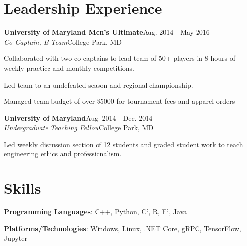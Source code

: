 \documentclass[letterpaper,11pt]{article}
\def \jobskip{.5em}
\newcommand{\resentry}[6]{
\large{\sffamily\textbf{#1}}\hfill{\rmfamily\normalsize\textcolor{faded}{#2}} \\
\normalsize{#3}\hfill{\textcolor{faded}{\normalsize#4}}\\
\normalsize{#5}
\footnotesize{#6}
}
\newcommand{\resitem}[1]{\normalsize{\item #1}}
\begin{document}
\section*{Leadership Experience}
\resentry{{University of Maryland Men's Ultimate}}{Aug. 2014 \-- May 2016}{\emph{Co-Captain, B Team}}{College Park, MD}{\vspace{-1em}}
   { 
      \begin{resumeitemize}
	\item{Collaborated with two co-captains to lead team of 50+ players in 8 hours of weekly practice and monthly competitions.}
	\item{Led team to an undefeated season and regional championship.}
	\item{Managed team budget of over \$5000 for tournament fees and apparel orders}
          \end{resumeitemize}
}
\vspace{\jobskip}
\resentry{{University of Maryland}}{Aug. 2014 \-- Dec. 2014}{\emph{Undergraduate Teaching Fellow}}{College Park, MD}{\vspace{-1em}}
   { 
      \begin{resumeitemize}
	\item{Led weekly discussion section of 12 students and graded student work to teach engineering ethics and professionalism.}
          \end{resumeitemize}
}
\section*{Skills}
\begin{skillsitemize} 
\resitem{\textbf{Programming Languages}: C++, Python, C$^\sharp$, R, F$^\sharp$, Java}
\resitem{\textbf{Platforms/Technologies}: Windows, Linux, .NET Core, gRPC, TensorFlow, Jupyter}
\end{skillsitemize}
\end{document}
